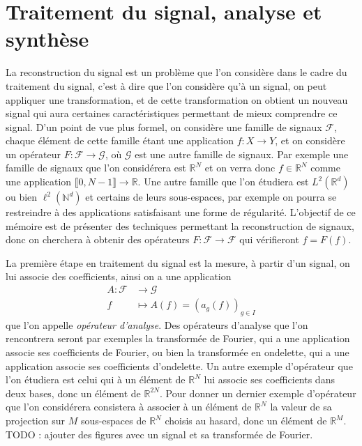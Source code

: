 \section{Traitement du signal, analyse et synthèse}
La reconstruction du signal est un problème que l'on considère dans le cadre du traitement du signal, c'est à dire que l'on considère qu'à un signal, on peut appliquer une transformation, et de cette transformation on obtient un nouveau signal qui aura certaines caractéristiques permettant de mieux comprendre ce signal.
D'un point de vue plus formel, on considère une famille de signaux $\mathcal{F}$, chaque élément de cette famille étant une application $f : X \longrightarrow Y$, et on considère un opérateur $F : \mathcal{F} \longrightarrow \mathcal{G}$, où $\mathcal{G}$ est une autre famille de signaux.
\newline
Par exemple une famille de signaux que l'on considérera est $\mathbb{R}^N$ et on verra donc $f\in \mathbb{R}^N$ comme une application $\llbracket 0,N-1 \rrbracket \rightarrow \mathbb{R}$.
Une autre famille que l'on étudiera est $L^2(\mathbb{R}^d)$ ou bien $\ell^2(\mathbb{N}^d)$ et certains de leurs sous-espaces, par exemple on pourra se restreindre à des applications satisfaisant une forme de régularité. 
\newline
L'objectif de ce mémoire est de présenter des techniques permettant la reconstruction de signaux, donc on cherchera à obtenir des opérateurs $F	:\mathcal{F} \rightarrow \mathcal{F}$ qui vérifieront $f=F(f)$. 

La première étape en traitement du signal est la mesure, à partir d'un signal, on lui associe des coefficients, ainsi on a une application
\begin{align}
	A : 	\mathcal{F} &\longrightarrow \mathcal{G} \\
		f &\longmapsto A(f) = (a_g(f))_{g\in I}
\end{align}
que l'on appelle \emph{opérateur d'analyse}.
\newline
Des opérateurs d'analyse que l'on rencontrera seront par exemples la transformée de Fourier, qui a une application associe ses coefficients de Fourier, ou bien la transformée en ondelette, qui a une application associe ses coefficients d'ondelette.
Un autre exemple d'opérateur que l'on étudiera est celui qui à un élément de $\mathbb{R}^N$ lui associe ses coefficients dans deux bases, donc un élément de $\mathbb{R}^{2N}$.
Pour donner un dernier exemple d'opérateur que l'on considérera consistera à associer à un élément de $\mathbb{R}^N$ la valeur de sa projection sur $M$ sous-espaces de $\mathbb{R}^N$ choisis au hasard, donc un élément de $\mathbb{R}^M$.
\newline 
TODO : ajouter des figures avec un signal et sa transformée de Fourier.

